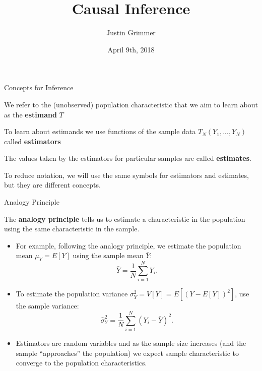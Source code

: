 \documentclass{beamer}
\title[Causal Inference] %
{Causal Inference}
\author{Justin Grimmer}
\institute[University of Chicago]{Associate Professor\\Department of Political Science \\  University of Chicago}
\date{April 9th, 2018}
\numberwithin{equation}{section}
\begin{document}
\begin{frame}
\titlepage
\end{frame}

\begin{frame}{Concepts for Inference}

We refer to the (unobserved) population characteristic that we aim to
learn about as the \textbf{estimand} $T$

\pause

To learn about estimands we use functions of the sample data
$T_N(Y_1,...,Y_N)$ called \textbf{estimators}

\pause

The values taken by the estimators for particular samples are called
\textbf{estimates}.

To reduce notation, we will use the same symbols for estimators and
estimates, but they are different concepts.

\end{frame}

\begin{frame}{Analogy Principle}

The \textbf{analogy principle} tells us to estimate a characteristic in
the population using the same characteristic in the sample.

\pause

\begin{itemize}
\itemsep1pt\parskip0pt
\item
  For example, following the analogy principle, we estimate the
  population mean $\mu_Y=E[Y]$ using the sample mean $\bar{Y}$:
  \[ \bar{Y}=\frac{1}{N}\sum_{i=1}^N Y_i. \]
\end{itemize}

\pause

\begin{itemize}
\item
  To estimate the population variance
  $\sigma^2_Y=V[Y]=E[(Y - E[Y])^2]$, use the sample variance:
  \[ \widehat{\sigma}^2_Y =\frac{1}{N}\sum_{i=1}^N (Y_i-\bar{Y})^2. \]
\item
  Estimators are random variables and as the sample size increases (and
  the sample ``approaches'' the population) we expect sample
  characteristic to converge to the population characteristics.
\end{itemize}

\end{frame}
\end{document}
